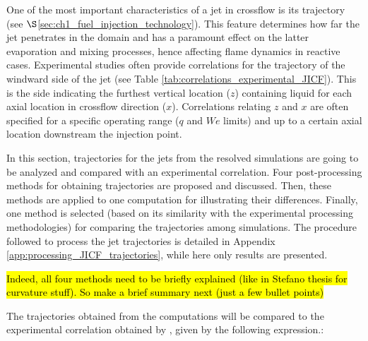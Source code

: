 One of the most important characteristics of a jet in crossflow is its trajectory (see $\S$\ref{sec:ch1_fuel_injection_technology}). This feature determines how far the jet penetrates in the domain and has a paramount effect on the latter evaporation and mixing processes, hence affecting flame dynamics in reactive cases. Experimental studies often provide correlations for the trajectory of the windward side of the jet (see Table \ref{tab:correlations_experimental_JICF}). This is the side indicating the furthest vertical location ($z$) containing liquid for each axial location in crossflow direction ($x$). Correlations relating $z$ and $x$ are often specified for a specific operating range ($q$ and $We$ limits) and up to a certain axial location downstream the injection point. 

In this section, trajectories for the jets from the resolved simulations are going to be analyzed and compared with an experimental correlation. Four post-processing methods for obtaining trajectories are proposed and discussed. Then, these methods are applied to one computation for illustrating their differences. Finally, one method is selected (based on its similarity with the experimental processing methodologies) for comparing the trajectories among simulations. The procedure followed to process the jet trajectories is detailed in Appendix \ref{app:processing_JICF_trajectories}, while here only results are presented. 

\hl{Indeed, all four methods need to be briefly explained (like in Stefano thesis for curvature stuff). So make a brief summary next (just a few bullet points)}






The trajectories obtained from the computations will be compared to the experimental correlation obtained by , given by the following expression.:


